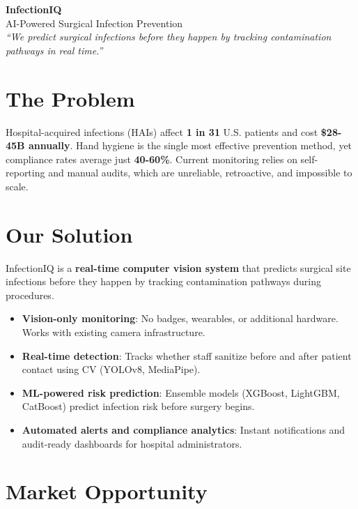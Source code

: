 \documentclass[11pt,a4paper]{article}
\begin{document}
\begin{center}
    {\LARGE\bfseries\color{primary} InfectionIQ}\\[4pt]
    {\large\color{darkgray} AI-Powered Surgical Infection Prevention}\\[3pt]
    {\small\color{darkgray} \textit{``We predict surgical infections before they happen by tracking contamination pathways in real time.''}}
\end{center}

\vspace{-2pt}

\section{The Problem}

Hospital-acquired infections (HAIs) affect \textbf{1 in 31} U.S. patients and cost \textbf{\$28{-}45B annually}. Hand hygiene is the single most effective prevention method, yet compliance rates average just \textbf{40{-}60\%}. Current monitoring relies on self-reporting and manual audits, which are unreliable, retroactive, and impossible to scale.

\section{Our Solution}

InfectionIQ is a \textbf{real-time computer vision system} that predicts surgical site infections before they happen by tracking contamination pathways during procedures.

\begin{itemize}[leftmargin=1.2em, itemsep=2pt]
    \item \textbf{Vision-only monitoring}: No badges, wearables, or additional hardware. Works with existing camera infrastructure.
    \item \textbf{Real-time detection}: Tracks whether staff sanitize before and after patient contact using CV (YOLOv8, MediaPipe).
    \item \textbf{ML-powered risk prediction}: Ensemble models (XGBoost, LightGBM, CatBoost) predict infection risk before surgery begins.
    \item \textbf{Automated alerts and compliance analytics}: Instant notifications and audit-ready dashboards for hospital administrators.
\end{itemize}

\section{Market Opportunity}
\end{document}
